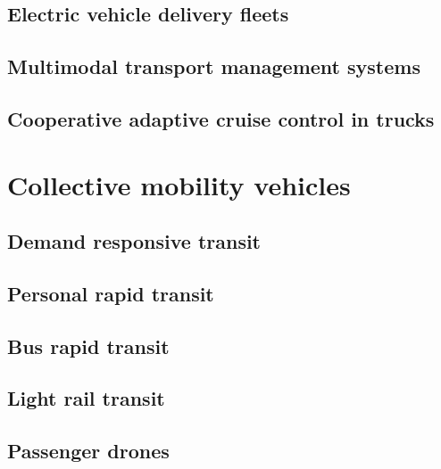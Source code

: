\documentclass[
]{book}
\begin{document}
\hypertarget{electric-vehicle-delivery-fleets}{%
\section{Electric vehicle delivery fleets}\label{electric-vehicle-delivery-fleets}}

\hypertarget{multimodal-transport-management-systems}{%
\section{Multimodal transport management systems}\label{multimodal-transport-management-systems}}

\hypertarget{cooperative-adaptive-cruise-control-in-trucks}{%
\section{Cooperative adaptive cruise control in trucks}\label{cooperative-adaptive-cruise-control-in-trucks}}

\hypertarget{collective}{%
\chapter{Collective mobility vehicles}\label{collective}}

\hypertarget{demand-responsive-transit}{%
\section{Demand responsive transit}\label{demand-responsive-transit}}

\hypertarget{personal-rapid-transit}{%
\section{Personal rapid transit}\label{personal-rapid-transit}}

\hypertarget{bus-rapid-transit}{%
\section{Bus rapid transit}\label{bus-rapid-transit}}

\hypertarget{light-rail-transit}{%
\section{Light rail transit}\label{light-rail-transit}}

\hypertarget{passenger-drones}{%
\section{Passenger drones}\label{passenger-drones}}
\end{document}
